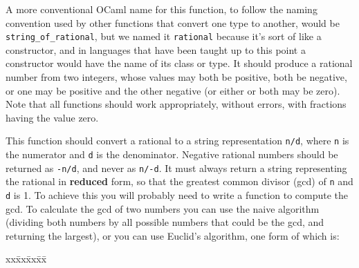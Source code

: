 \documentclass[11pt]{article}
\begin{document}
    \begin{description}

      \addtolength{\itemsep}{-1mm}

      \item[\texttt{\textmd{rational}}:] A more conventional OCaml name
            for this function, to follow the naming convention used by
            other functions that convert one type to another, would be
            \texttt{string\_of\_rational}, but we named it
            \texttt{rational} because it's sort of like a constructor, and
            in languages that have been taught up to this point a
            constructor would have the name of its class or type.  It should
            produce a rational number from two integers, whose values may
            both be positive, both be negative, or one may be positive and
            the other negative (or either or both may be zero).  Note that
            all functions should work appropriately, without errors, with
            fractions having the value zero.

            \enlargethispage{5mm}

      \item[\texttt{\textmd{string\_of\_rational}}:] This function should
            convert a rational to a string representation \texttt{n/d},
            where \texttt{n} is the numerator and \texttt{d} is the
            denominator.  Negative rational numbers should be returned as
            \texttt{-n/d}, and never as \texttt{n/-d}.  It must always
            return a string representing the rational in \textbf{reduced}
            form, so that the greatest common divisor (gcd) of \texttt{n}
            and \texttt{d} is 1.  To achieve this you will probably need to
            write a function to compute the gcd.  To calculate the gcd of
            two numbers you can use the naive algorithm (dividing both
            numbers by all possible numbers that could be the gcd, and
            returning the largest), or you can use Euclid's algorithm, one
            form of which is:

            \hspace{4mm}
            \begin{minipage}[t]{3in}

              \begin{tabbing}


                xx\=xx\=xx\=xx\=\kill


\end{tabbing}
\end{minipage}
\end{description}
\end{document}
